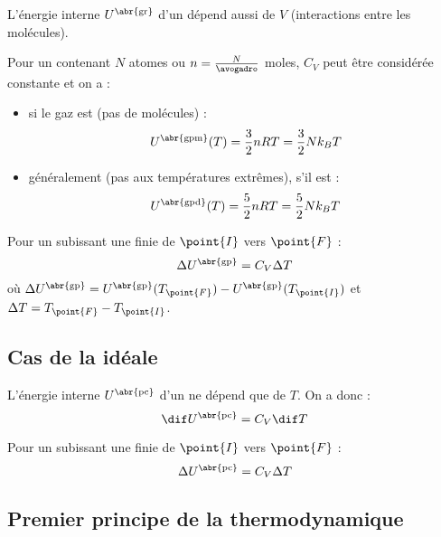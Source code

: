 \begin{remarque}
L'énergie interne $U^{\text{\abr{gr}}}$ d'un  dépend aussi de $V$ (interactions entre les molécules).
\end{remarque}

\begin{propriete}[admis]
Pour un  contenant $N$ atomes ou $n = \frac{N}{\avogadro}$ moles, $C_V$ peut être considérée constante et on a  :
\begin{itemize}
\item si le gaz est  (pas de molécules) :
\[U^{\text{\abr{gpm}}}(T) = \frac{3}{2} nRT = \frac{3}{2} N k_B T\]

\item généralement (pas aux températures extrêmes), s'il est  :
\[U^{\text{\abr{gpd}}}(T) = \frac{5}{2} nRT = \frac{5}{2} N k_B T\]
\end{itemize}
\end{propriete}

\begin{propriete}
Pour un  subissant une  finie de $\point{I}$ vers $\point{F}$ :
\[\Delta U^{\text{\abr{gp}}} = C_V \Delta T\]
où $\Delta U^{\text{\abr{gp}}} = U^{\text{\abr{gp}}}(T_{\point{F}}) - U^{\text{\abr{gp}}}(T_\point{I})$ et $\Delta T = T_{\point{F}} - T_{\point{I}}$.
\end{propriete}



\subsection{Cas de la  idéale}

\begin{propriete}[admis]
L'énergie interne $U^{\text{\abr{pc}}}$ d'un  ne dépend que de $T$. On a donc :
\[\dif U^{\text{\abr{pc}}} = C_V \dif T\]
\end{propriete}

\begin{propriete}
Pour un  subissant une  finie de $\point{I}$ vers $\point{F}$ :
\[\Delta U^{\text{\abr{pc}}} = C_V \Delta T\]
\end{propriete}

\subsection{Premier principe de la thermodynamique}

